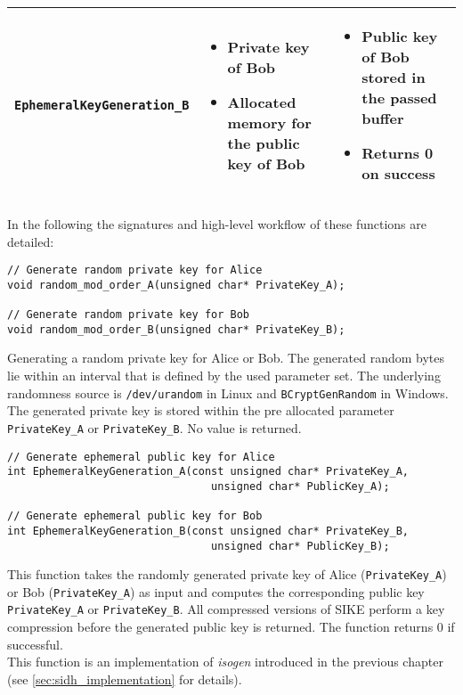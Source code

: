 \begin{table}[H]
\begin{tabular}{| c|m{4.8cm}|m{4.8cm}|}
        \texttt{EphemeralKeyGeneration\_B} &
        \begin{itemize}[noitemsep, leftmargin=*]
            \item Private key of Bob
            \item Allocated memory for the public key of Bob
        \end{itemize} & 
        \begin{itemize}[noitemsep, leftmargin=*]
            \item Public key of Bob stored in the passed buffer
			\item Returns 0 on success
        \end{itemize} \\
        \hline
    \end{tabular}
\end{table}

In the following the signatures and high-level workflow of these functions are detailed:


\begin{lstlisting}[]
// Generate random private key for Alice
void random_mod_order_A(unsigned char* PrivateKey_A);

// Generate random private key for Bob
void random_mod_order_B(unsigned char* PrivateKey_B);
\end{lstlisting}
Generating a random private key for Alice or Bob. The generated random bytes lie within an interval that is defined by the used parameter set. The underlying randomness source is \texttt{/dev/urandom} in Linux and \texttt{BCryptGenRandom} in Windows. The generated private key is stored within the pre allocated parameter \texttt{PrivateKey\_A} or \texttt{PrivateKey\_B}. No value is returned.

\begin{lstlisting}[]
// Generate ephemeral public key for Alice
int EphemeralKeyGeneration_A(const unsigned char* PrivateKey_A,
							    unsigned char* PublicKey_A);
							    
// Generate ephemeral public key for Bob
int EphemeralKeyGeneration_B(const unsigned char* PrivateKey_B,
							    unsigned char* PublicKey_B);
\end{lstlisting}
This function takes the randomly generated private key of Alice (\texttt{PrivateKey\_A}) or Bob (\texttt{PrivateKey\_A}) as input and computes the corresponding public key \texttt{PrivateKey\_A} or \texttt{PrivateKey\_B}. All compressed versions of \gls{SIKE} perform a key compression before the generated public key is returned. The function returns 0 if successful.\\
This function is an implementation of \textit{isogen} introduced in the previous chapter (see \autoref{sec:sidh_implementation} for details).

